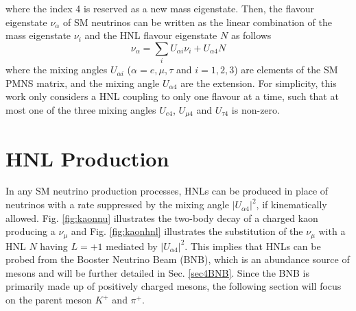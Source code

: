 where the index 4 is reserved as a new mass eigenstate.
Then, the flavour eigenstate  $\nu_{\alpha}$ of SM neutrinos can be written as the linear combination of the mass eigenstate $\nu_{i}$ and the HNL flavour eigenstate $N$ as follows 
\begin{equation}
	\nu_{\alpha}=\sum_i U_{\alpha i}\nu_{i} + U_{\alpha 4}N
\end{equation}
where the mixing angles $U_{\alpha i }$ ($\alpha=e,\mu,\tau$ and $i=1,2,3$) are elements of the SM PMNS matrix, and the mixing angle $U_{\alpha 4}$ are the extension.
For simplicity, this work only considers a HNL coupling to only one flavour at a time, such that at most one of the three mixing angles $U_{e4}$, $U_{\mu4}$ and $U_{\tau4}$ is non-zero.


 
\section{HNL Production}
\label{sec2Production}
In any SM neutrino production processes, HNLs can be produced in place of neutrinos with a rate suppressed by the mixing angle $|U_{\alpha4}|^{2}$, if kinematically allowed. 
Fig. \ref{fig:kaonnu} illustrates the two-body decay of a charged kaon producing a $\nu_{\mu}$ and Fig. \ref{fig:kaonhnl} illustrates the substitution of the $\nu_{\mu}$ with a HNL $N$ having $L = +1$ mediated by $|U_{\alpha4}|^{2}$. 
This implies that HNLs can be probed from the Booster Neutrino Beam (BNB), which is an abundance source of mesons and will be further detailed in Sec. \ref{sec4BNB}.
Since the BNB is primarily made up of positively charged mesons, the following section will focus on the parent meson $K^+$ and $\pi^+$.  

